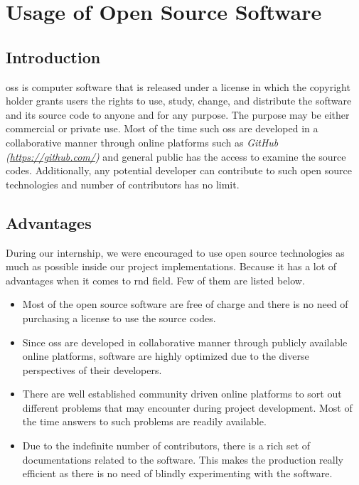 \documentclass[a4paper,12pt]{report}%
\begin{document}
\section{Usage of Open Source Software}

\subsection{Introduction}

\Ac{oss} is computer software that is released under a license in which the copyright holder grants users the rights to use, study, change, and distribute the software and its source code to anyone and for any purpose\cite{oss}. The purpose may be either commercial or private use. Most of the time such \ac{oss} are developed in a collaborative manner through  online platforms such as \textit{GitHub (\url{https://github.com/})} and general public has the access to examine the source codes. Additionally, any potential developer can contribute to such open source technologies and number of contributors has no limit.


\subsection{Advantages}

During our internship, we were encouraged  to use open source technologies as much as possible inside our project implementations. Because it has a lot of advantages when it comes to \ac{rnd} field. Few of them are listed below.

\begin{itemize}
	\item Most of the open source software are free of charge and there is no need of purchasing a license to use the source codes.
	
	\item Since \ac{oss} are developed in collaborative manner through publicly available online platforms, software are highly optimized due to the diverse perspectives of their developers. 
	
	\item There are  well established community driven online platforms to sort out different problems that may encounter during project development. Most of the time answers to such problems are readily available.
	
	\item Due to the indefinite number of contributors, there is a rich set of documentations related to the software. This makes the production really efficient as there is no need of blindly experimenting with the software.

\end{itemize}
\end{document}
